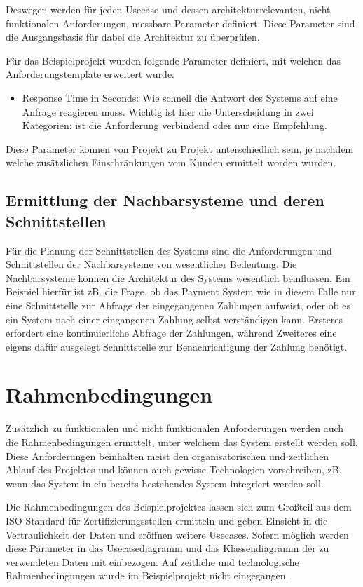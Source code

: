 Deswegen werden für jeden Usecase und dessen architekturrelevanten, nicht funktionalen Anforderungen, messbare Parameter definiert. Diese Parameter sind die Ausgangsbasis für dabei die Architektur zu überprüfen.

Für das Beispielprojekt wurden folgende Parameter definiert, mit welchen das Anforderungstemplate erweitert wurde:

\begin{itemize}
  \item Response Time in Seconds: Wie schnell die Antwort des Systems auf eine Anfrage reagieren muss. Wichtig ist hier die Unterscheidung in zwei Kategorien: ist die Anforderung verbindend oder nur eine Empfehlung.
\end{itemize}

Diese Parameter können von Projekt zu Projekt unterschiedlich sein, je nachdem welche zusätzlichen Einschränkungen vom Kunden ermittelt worden wurden.

\subsection{Ermittlung der Nachbarsysteme und deren Schnittstellen}
Für die Planung der Schnittstellen des Systems sind die Anforderungen und Schnittstellen der Nachbarsysteme von wesentlicher Bedeutung. Die Nachbarsysteme können die Architektur des Systems wesentlich beinflussen. Ein Beispiel hierfür ist zB. die Frage, ob das Payment System wie in diesem Falle nur eine Schnittstelle zur Abfrage der eingegangenen Zahlungen aufweist, oder ob es ein System nach einer eingangenen Zahlung selbst verständigen kann. Ersteres erfordert eine kontinuierliche Abfrage der Zahlungen, während Zweiteres eine eigens dafür ausgelegt Schnittstelle zur Benachrichtigung der Zahlung benötigt.

\section{Rahmenbedingungen}
Zusätzlich zu funktionalen und nicht funktionalen Anforderungen werden auch die Rahmenbedingungen ermittelt, unter welchem das System erstellt werden soll. Diese Anforderungen beinhalten meist den organisatorischen und zeitlichen Ablauf des Projektes und können auch gewisse Technologien vorschreiben, zB. wenn das System in ein bereits bestehendes System integriert werden soll. \cite[S. 9]{review}\cite[S. 110]{softarch}

Die Rahmenbedingungen des Beispielprojektes lassen sich zum Großteil aus dem ISO Standard für Zertifizierungsstellen ermitteln \cite{ISO_CERT} und geben Einsicht in die Vertraulichkeit der Daten und eröffnen weitere Usecases. Sofern möglich werden diese Parameter in das Usecasediagramm und das Klassendiagramm der zu verwendeten Daten mit einbezogen. Auf zeitliche und technologische Rahmenbedingungen wurde im Beispielprojekt nicht eingegangen.


